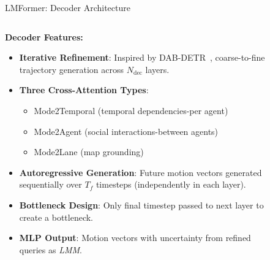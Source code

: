 \documentclass[10pt,aspectratio=169]{beamer}
\begin{document}
\begin{frame}{LMFormer: Decoder Architecture}
    \begin{columns}[T]
        \begin{column}{0.5\textwidth}
            \textbf{Decoder Features:}
            \begin{itemize}
                \item \textbf{Iterative Refinement}: Inspired by DAB-DETR~\cite{liu2022dabdetr}, coarse-to-fine trajectory generation across \(N_{\text{dec}}\) layers.
                \item \textbf{Three Cross-Attention Types}:
                    \begin{itemize}
                        \item Mode2Temporal (temporal dependencies-per agent)
                        \item Mode2Agent (social interactions-between agents)
                        \item Mode2Lane (map grounding)
                    \end{itemize}
                \item \textbf{Autoregressive Generation}: Future motion vectors generated sequentially over \(T_f\) timesteps (independently in each layer).
                \item \textbf{Bottleneck Design}: Only final timestep passed to next layer to create a bottleneck.
                \item \textbf{MLP Output}: Motion vectors with uncertainty from refined queries as \emph{LMM}.
            \end{itemize}
        \end{column}
        \begin{column}{0.5\textwidth}
            \begin{figure}

\end{figure}
\end{column}
\end{columns}
\end{frame}
\end{document}
